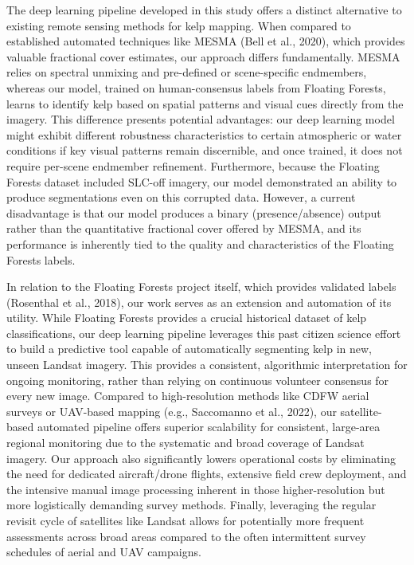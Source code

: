\documentclass{article}
\begin{document}
The deep learning pipeline developed in this study offers a distinct alternative to existing remote sensing methods for kelp mapping. When compared to established automated techniques like MESMA (Bell et al., 2020), which provides valuable fractional cover estimates, our approach differs fundamentally. MESMA relies on spectral unmixing and pre-defined or scene-specific endmembers, whereas our model, trained on human-consensus labels from Floating Forests, learns to identify kelp based on spatial patterns and visual cues directly from the imagery. This difference presents potential advantages: our deep learning model might exhibit different robustness characteristics to certain atmospheric or water conditions if key visual patterns remain discernible, and once trained, it does not require per-scene endmember refinement. Furthermore, because the Floating Forests dataset included SLC-off imagery, our model demonstrated an ability to produce segmentations even on this corrupted data. However, a current disadvantage is that our model produces a binary (presence/absence) output rather than the quantitative fractional cover offered by MESMA, and its performance is inherently tied to the quality and characteristics of the Floating Forests labels.

In relation to the Floating Forests project itself, which provides validated labels (Rosenthal et al., 2018), our work serves as an extension and automation of its utility. While Floating Forests provides a crucial historical dataset of kelp classifications, our deep learning pipeline leverages this past citizen science effort to build a predictive tool capable of automatically segmenting kelp in new, unseen Landsat imagery. This provides a consistent, algorithmic interpretation for ongoing monitoring, rather than relying on continuous volunteer consensus for every new image. Compared to high-resolution methods like CDFW aerial surveys or UAV-based mapping (e.g., Saccomanno et al., 2022), our satellite-based automated pipeline offers superior scalability for consistent, large-area regional monitoring due to the systematic and broad coverage of Landsat imagery. Our approach also significantly lowers operational costs by eliminating the need for dedicated aircraft/drone flights, extensive field crew deployment, and the intensive manual image processing inherent in those higher-resolution but more logistically demanding survey methods. Finally, leveraging the regular revisit cycle of satellites like Landsat allows for potentially more frequent assessments across broad areas compared to the often intermittent survey schedules of aerial and UAV campaigns.
\end{document}

